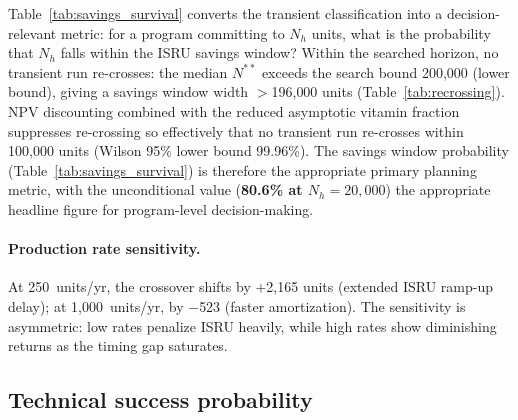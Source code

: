 

Table~\ref{tab:savings_survival} converts the transient classification into a decision-relevant metric: for a program committing to $N_h$ units, what is the probability that $N_h$ falls within the ISRU savings window? Within the searched horizon, no transient run re-crosses: the median $N^{**}$ exceeds the search bound 200{,}000 (lower bound), giving a savings window width $>$196{,}000 units (Table~\ref{tab:recrossing}). NPV discounting combined with the reduced asymptotic vitamin fraction suppresses re-crossing so effectively that no transient run re-crosses within 100{,}000 units (Wilson 95\% lower bound 99.96\%). The savings window probability (Table~\ref{tab:savings_survival}) is therefore the appropriate primary planning metric, with the unconditional value (\textbf{80.6\% at $N_h = 20{,}000$}) the appropriate headline figure for program-level decision-making.



\paragraph{Production rate sensitivity.} At 250~units/yr, the crossover shifts by $+$2{,}165 units (extended ISRU ramp-up delay); at 1{,}000~units/yr, by $-$523 (faster amortization). The sensitivity is asymmetric: low rates penalize ISRU heavily, while high rates show diminishing returns as the timing gap saturates.

\subsection{Technical success probability}
\label{sec:success_probability}

